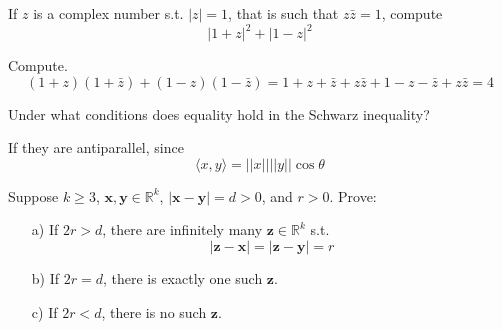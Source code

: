   \begin{exercise}[Rudin 1.14]
    If $z$ is a complex number s.t. $|z| = 1$, that is such that $z \bar{z} = 1$, compute 
    \begin{equation}
      |1 + z|^2 + |1 - z|^2
    \end{equation}
  \end{exercise}
  \begin{solution}
    Compute. 
    \begin{equation}
      (1 + z) (1 + \bar{z}) + (1 - z) (1 - \bar{z}) = 1 + z + \bar{z} + z \bar{z} + 1 - z - \bar{z} + z \bar{z} = 4
    \end{equation}
  \end{solution}

  \begin{exercise}[Rudin 1.15]
    Under what conditions does equality hold in the Schwarz inequality? 
  \end{exercise}
  \begin{solution}
    If they are antiparallel, since 
    \begin{equation}
      \langle x, y \rangle = ||x || ||y || \cos{\theta}
    \end{equation}
  \end{solution}

  \begin{exercise}[Rudin 1.16]
    Suppose $k \geq 3$, $\mathbf{x}, \mathbf{y} \in \mathbb{R}^k$, $|\mathbf{x} - \mathbf{y}| = d > 0$, and $r > 0$. Prove: 
    \begin{enumerate}
      \item[a)] If $2r > d$, there are infinitely many $\mathbf{z} \in \mathbb{R}^k$ s.t. 
      \[|\mathbf{z} - \mathbf{x}| = |\mathbf{z} - \mathbf{y}| = r\]
      \item[b)] If $2r = d$, there is exactly one such $\mathbf{z}$. 
      \item[c)] If $2r < d$, there is no such $\mathbf{z}$. 
    \end{enumerate}
  \end{exercise}

